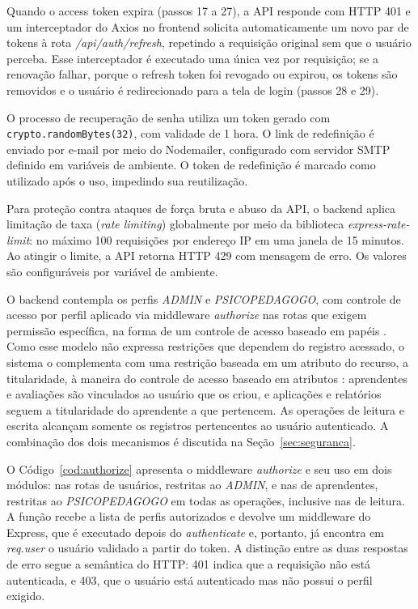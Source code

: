 Quando o access token expira (passos 17 a 27), a API responde com HTTP 401 e um interceptador do Axios no frontend solicita automaticamente um novo par de tokens à rota \textit{/api/auth/refresh}, repetindo a requisição original sem que o usuário perceba. Esse interceptador é executado uma única vez por requisição; se a renovação falhar, porque o refresh token foi revogado ou expirou, os tokens são removidos e o usuário é redirecionado para a tela de login (passos 28 e 29).

O processo de recuperação de senha utiliza um token gerado com \texttt{crypto.randomBytes(32)}, com validade de 1 hora. O link de redefinição é enviado por e-mail por meio do Nodemailer, configurado com servidor SMTP definido em variáveis de ambiente. O token de redefinição é marcado como utilizado após o uso, impedindo sua reutilização.

Para proteção contra ataques de força bruta e abuso da API, o backend aplica limitação de taxa (\textit{rate limiting}) globalmente por meio da biblioteca \textit{express-rate-limit}: no máximo 100 requisições por endereço IP em uma janela de 15 minutos. Ao atingir o limite, a API retorna HTTP 429 com mensagem de erro. Os valores são configuráveis por variável de ambiente.

O backend contempla os perfis \textit{ADMIN} e \textit{PSICOPEDAGOGO}, com controle de acesso por perfil aplicado via middleware \textit{authorize} nas rotas que exigem permissão específica, na forma de um controle de acesso baseado em papéis \cite{sandhu1996_rbac}. Como esse modelo não expressa restrições que dependem do registro acessado, o sistema o complementa com uma restrição baseada em um atributo do recurso, a titularidade, à maneira do controle de acesso baseado em atributos \cite{hu2014_abac}: aprendentes e avaliações são vinculados ao usuário que os criou, e aplicações e relatórios seguem a titularidade do aprendente a que pertencem. As operações de leitura e escrita alcançam somente os registros pertencentes ao usuário autenticado. A combinação dos dois mecanismos é discutida na Seção~\ref{sec:seguranca}.

O Código~\ref{cod:authorize} apresenta o middleware \textit{authorize} e seu uso em dois módulos: nas rotas de usuários, restritas ao \textit{ADMIN}, e nas de aprendentes, restritas ao \textit{PSICOPEDAGOGO} em todas as operações, inclusive nas de leitura. A função recebe a lista de perfis autorizados e devolve um middleware do Express, que é executado depois do \textit{authenticate} e, portanto, já encontra em \textit{req.user} o usuário validado a partir do token. A distinção entre as duas respostas de erro segue a semântica do HTTP: 401 indica que a requisição não está autenticada, e 403, que o usuário está autenticado mas não possui o perfil exigido.

